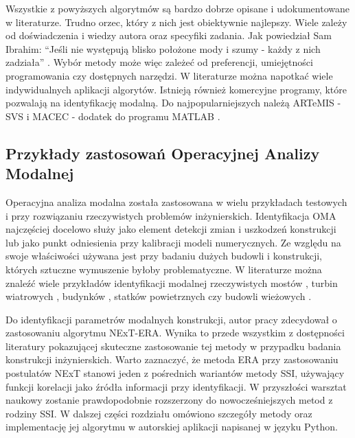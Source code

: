 Wszystkie z powyższych algorytmów są bardzo dobrze opisane i udokumentowane w literaturze. Trudno orzec, który z nich jest obiektywnie najlepszy. Wiele zależy od doświadczenia i wiedzy autora oraz specyfiki zadania. Jak powiedział Sam Ibrahim: \enquote{Jeśli nie występują blisko położone mody i szumy - każdy z nich zadziała} . Wybór metody może więc zależeć od preferencji, umiejętności programowania czy dostępnych narzędzi. W literaturze można napotkać wiele indywidualnych aplikacji algorytów. Istnieją również komercyjne programy, które pozwalają na identyfikację modalną. Do najpopularniejszych należą ARTeMIS - SVS \parencite{Extractor1999} i MACEC - dodatek do programu MATLAB \parencite{Reynders2014}.

\subsection{Przykłady zastosowań Operacyjnej Analizy Modalnej}
Operacyjna analiza modalna została zastosowana w wielu przykładach testowych i przy rozwiązaniu rzeczywistych problemów inżynierskich. Identyfikacja OMA najczęściej docelowo służy jako element detekcji zmian i uszkodzeń konstrukcji lub jako punkt odniesienia przy kalibracji modeli numerycznych. Ze względu na swoje właściwości używana jest przy badaniu dużych budowli i konstrukcji, których sztuczne wymuszenie byłoby problematyczne. W literaturze można znaleźć wiele przykładów identyfikacji modalnej rzeczywistych mostów \parencite{L.Hermans1999,Siringoringo2008,Degrauwe2008,Liu2009,Bayraktar2009,Brownjohn2010,Dohler2011,Zwolski2011,Magalhaes2012,Benedettini2015,Brownjohn2017,Brownjohn2018,Poprawa2018,Barbieri2019,Qin2019,Favarelli2021}, turbin wiatrowych \parencite{Carne2010,Sarrafi2018}, budynków \parencite{Zhu2018,Xie2021}, statków powietrznych \parencite{SHEN2003,Moncayo2010} czy budowli wieżowych \parencite{Cabboi2017,Szafranski2020}. 

Do identyfikacji parametrów modalnych konstrukcji, autor pracy zdecydował o zastosowaniu algorytmu NExT-ERA. Wynika to przede wszystkim z dostępności literatury pokazującej skuteczne zastosowanie tej metody w przypadku badania konstrukcji inżynierskich. Warto zaznaczyć, że metoda ERA przy zastosowaniu postulatów NExT stanowi jeden z pośrednich wariantów metody SSI, używający funkcji korelacji jako źródła informacji przy identyfikacji. W przyszłości warsztat naukowy zostanie prawdopodobnie rozszerzony do nowocześniejszych metod z rodziny SSI. W dalszej części rozdziału omówiono szczegóły metody oraz implementację jej algorytmu w autorskiej aplikacji napisanej w języku Python.


